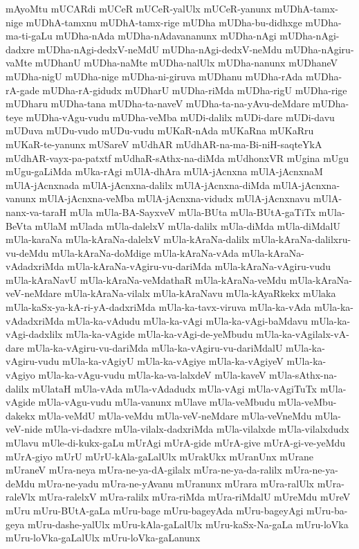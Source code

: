 {mAyoMtu
mUCARdi
mUCeR
mUCeR-yalUlx
mUCeR-yanunx
mUDhA-tamx-nige
mUDhA-tamxnu
mUDhA-tamx-rige
mUDha
mUDha-bu-didhxge
mUDha-ma-ti-gaLu
mUDha-nAda
mUDha-nAdavananunx
mUDha-nAgi
mUDha-nAgi-dadxre
mUDha-nAgi-dedxV-neMdU
mUDha-nAgi-dedxV-neMdu
mUDha-nAgiru-vaMte
mUDhanU
mUDha-naMte
mUDha-nalUlx
mUDha-nanunx
mUDhaneV
mUDha-nigU
mUDha-nige
mUDha-ni-giruva
mUDhanu
mUDha-rAda
mUDha-rA-gade
mUDha-rA-gidudx
mUDharU
mUDha-riMda
mUDha-rigU
mUDha-rige
mUDharu
mUDha-tana
mUDha-ta-naveV
mUDha-ta-na-yAvu-deMdare
mUDha-teye
mUDha-vAgu-vudu
mUDha-veMba
mUDi-dalilx
mUDi-dare
mUDi-davu
mUDuva
mUDu-vudo
mUDu-vudu
mUKaR-nAda
mUKaRna
mUKaRru
mUKaR-te-yanunx
mUSareV
mUdhAR
mUdhAR-na-ma-Bi-niH-saqteYkA
mUdhAR-vayx-pa-patxtf
mUdhaR-sAthx-na-diMda
mUdhonxVR
mUgina
mUgu
mUgu-gaLiMda
mUka-rAgi
mUlA-dhAra
mUlA-jAcnxna
mUlA-jAcnxnaM
mUlA-jAcnxnada
mUlA-jAcnxna-dalilx
mUlA-jAcnxna-diMda
mUlA-jAcnxna-vanunx
mUlA-jAcnxna-veMba
mUlA-jAcnxna-vidudx
mUlA-jAcnxnavu
mUlA-nanx-va-taraH
mUla
mUla-BA-SayxveV
mUla-BUta
mUla-BUtA-gaTiTx
mUla-BeVta
mUlaM
mUlada
mUla-dalelxV
mUla-dalilx
mUla-diMda
mUla-diMdalU
mUla-karaNa
mUla-kAraNa-dalelxV
mUla-kAraNa-dalilx
mUla-kAraNa-dalilxru-vu-deMdu
mUla-kAraNa-doMdige
mUla-kAraNa-vAda
mUla-kAraNa-vAdadxriMda
mUla-kAraNa-vAgiru-vu-dariMda
mUla-kAraNa-vAgiru-vudu
mUla-kAraNavU
mUla-kAraNa-veMdathaR
mUla-kAraNa-veMdu
mUla-kAraNa-veV-neMdare
mUla-kAraNa-vilalx
mUla-kAraNavu
mUla-kAyaRkekx
mUlaka
mUla-kaSx-ya-kA-ri-yA-dadxriMda
mUla-ka-tavx-viruva
mUla-ka-vAda
mUla-ka-vAdadxriMda
mUla-ka-vAdudu
mUla-ka-vAgi
mUla-ka-vAgi-baMdavu
mUla-ka-vAgi-dadxlilx
mUla-ka-vAgide
mUla-ka-vAgi-de-yeMbudu
mUla-ka-vAgilalx-vA-dare
mUla-ka-vAgiru-vu-dariMda
mUla-ka-vAgiru-vu-dariMdalU
mUla-ka-vAgiru-vudu
mUla-ka-vAgiyU
mUla-ka-vAgiye
mUla-ka-vAgiyeV
mUla-ka-vAgiyo
mUla-ka-vAgu-vudu
mUla-ka-va-lalxdeV
mUla-kaveV
mUla-sAthx-na-dalilx
mUlataH
mUla-vAda
mUla-vAdadudx
mUla-vAgi
mUla-vAgiTuTx
mUla-vAgide
mUla-vAgu-vudu
mUla-vanunx
mUlave
mUla-veMbudu
mUla-veMbu-dakekx
mUla-veMdU
mUla-veMdu
mUla-veV-neMdare
mUla-veVneMdu
mUla-veV-nide
mUla-vi-dadxre
mUla-vilalx-dadxriMda
mUla-vilalxde
mUla-vilalxdudx
mUlavu
mUle-di-kukx-gaLu
mUrAgi
mUrA-gide
mUrA-give
mUrA-gi-ve-yeMdu
mUrA-giyo
mUrU
mUrU-kAla-gaLalUlx
mUrakUkx
mUranUnx
mUrane
mUraneV
mUra-neya
mUra-ne-ya-dA-gilalx
mUra-ne-ya-da-ralilx
mUra-ne-ya-deMdu
mUra-ne-yadu
mUra-ne-yAvanu
mUranunx
mUrara
mUra-ralUlx
mUra-raleVlx
mUra-ralelxV
mUra-ralilx
mUra-riMda
mUra-riMdalU
mUreMdu
mUreV
mUru
mUru-BUtA-gaLa
mUru-bage
mUru-bageyAda
mUru-bageyAgi
mUru-ba-geya
mUru-dashe-yalUlx
mUru-kAla-gaLalUlx
mUru-kaSx-Na-gaLa
mUru-loVka
mUru-loVka-gaLalUlx
mUru-loVka-gaLanunx
}
